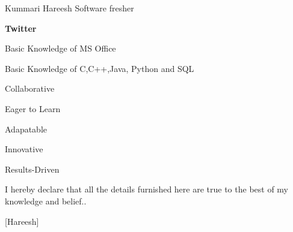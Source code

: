 \documentclass{article}
\begin{document}
\begin{cv}{Kummari Hareesh }{Software fresher}
\cvseparator[3]
\begin{cvitem}[Globe][4]
   \textbf{Twitter}\\
    \href{https://x.com/Harsha_9573?t=eY_wnhbSBcBRkyhDIfCUUg&s=09}{}
\end{cvitem}



\begin{cvitem}
    Basic Knowledge of MS Office
\end{cvitem}

\cvseparator
\begin{cvitem}
    Basic Knowledge of C,C++,Java, Python and SQL
\end{cvitem}

\cvseparator
\begin{cvitem}
    Collaborative
\end{cvitem}

\cvseparator
\begin{cvitem}
    Eager to Learn
\end{cvitem}

\cvseparator
\begin{cvitem}
    Adapatable
\end{cvitem}

\cvseparator
\begin{cvitem}
    Innovative
\end{cvitem}
\cvseparator
\begin{cvitem}
    Results-Driven
\end{cvitem}




 \end{cv}
     I hereby declare that all the details furnished here are true to the best of my knowledge and belief..
                                                 
                                                 [Hareesh]
\end{document}
